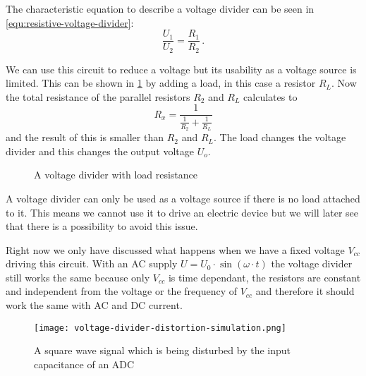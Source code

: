 The characteristic equation to describe a voltage divider can be seen in \cref{equ:resistive-voltage-divider}:
\begin{equation}
	\frac{U_1}{U_2} = \frac{R_1}{R_2}\,.
	\label{equ:resistive-voltage-divider}
\end{equation}

We can use this circuit to reduce a voltage but its usability as a voltage source is limited. This can be shown in \cref{fig:loaded-voltage-divider} by adding a load, in this case a resistor $R_L$. Now the total resistance of the parallel resistors $R_2$ and $R_L$ calculates to
\begin{equation*}
	R_x = \frac{1}{\frac{1}{R_2} + \frac{1}{R_L}}
\end{equation*}
and the result of this is smaller than $R_2$ and $R_L$. The load changes the voltage divider and this changes the output voltage $U_o$.


\begin{figure}[htb]
	\centering
	\caption{A voltage divider with load resistance}
	\label{fig:loaded-voltage-divider}
\end{figure}

A voltage divider can only be used as a voltage source if there is no load attached to it. This means we cannot use it to drive an electric device but we will later see that there is a possibility to avoid this issue.

Right now we only have discussed what happens when we have a fixed voltage $V_{cc}$ driving this circuit. With an AC supply $U = U_0 \cdot \sin(\omega \cdot t)$ the voltage divider still works the same because only $V_{cc}$ is time dependant, the resistors are constant and independent from the voltage or the frequency of $V_{cc}$ and therefore it should work the same with AC and DC current.

\begin{figure}[htb]
		\centering
		\texttt{[image: voltage-divider-distortion-simulation.png]}
		\caption{A square wave signal which is being disturbed by the input capacitance of an ADC}
		\label{fig:voltage-divider-distortion}
\end{figure}

